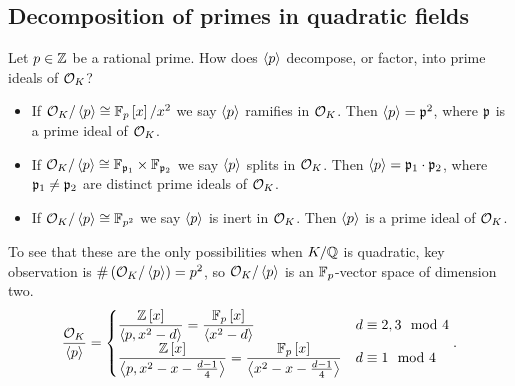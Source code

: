 \subsection{Decomposition of primes in quadratic fields}

Let $ p \in \Z $ be a rational prime. How does $ \ab{p} $ decompose, or factor, into prime ideals of $ \OO_K $?
\begin{itemize}
\item If $ \OO_K / \ab{p} \cong \F_p\sb{x} / x^2 $ we say $ \ab{p} $ ramifies in $ \OO_K $. Then $ \ab{p} = \pp^2 $, where $ \pp $ is a prime ideal of $ \OO_K $.
\item If $ \OO_K / \ab{p} \cong \F_{\pp_1} \times \F_{\pp_2} $ we say $ \ab{p} $ splits in $ \OO_K $. Then $ \ab{p} = \pp_1 \cdot \pp_2 $, where $ \pp_1 \ne \pp_2 $ are distinct prime ideals of $ \OO_K $.
\item If $ \OO_K / \ab{p} \cong \F_{p^2} $ we say $ \ab{p} $ is inert in $ \OO_K $. Then $ \ab{p} $ is a prime ideal of $ \OO_K $.
\end{itemize}
To see that these are the only possibilities when $ K / \Q $ is quadratic, key observation is $ \#\rb{\OO_K / \ab{p}} = p^2 $, so $ \OO_K / \ab{p} $ is an $ \F_p $-vector space of dimension two.
$$ \dfrac{\OO_K}{\ab{p}} =
\begin{cases}
\dfrac{\Z\sb{x}}{\ab{p, x^2 - d}} = \dfrac{\F_p\sb{x}}{\ab{x^2 - d}} & d \equiv 2, 3 \mod 4 \\
\dfrac{\Z\sb{x}}{\ab{p, x^2 - x - \tfrac{d - 1}{4}}} = \dfrac{\F_p\sb{x}}{\ab{x^2 - x - \tfrac{d - 1}{4}}} & d \equiv 1 \mod 4
\end{cases}.
$$

